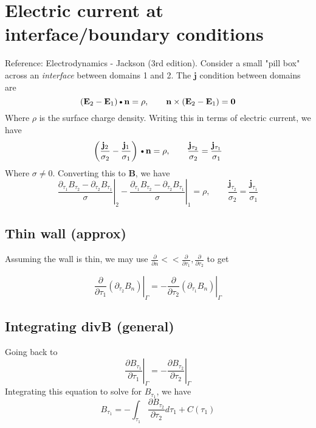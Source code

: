 \documentclass[11pt]{article}
\newcommand{\B}{\mathbf{B}}
\newcommand{\PD}{\partial}
\newcommand{\J}{\mathbf{j}}
\newcommand{\E}{\mathbf{E}}
\newcommand{\N}{\mathbf{n}}
\newcommand{\DOT}{\text{\textbullet}}
\begin{document}
\section{Electric current at interface/boundary conditions}
Reference: Electrodynamics - Jackson (3rd edition). Consider a small "pill box" across an \textit{interface} between domains 1 and 2. The $\J$ condition between domains are
\begin{equation}
    (\E_2 - \E_1) \DOT \N = \rho
    , \qquad
    \N \times (\E_2 - \E_1) = \mathbf{0}
\end{equation}
Where $\rho$ is the surface charge density. Writing this in terms of electric current, we have
\begin{equation}
    \left( \frac{\J_2}{\sigma_2} - \frac{\J_1}{\sigma_1} \right) \DOT \N = \rho
    , \qquad
    \frac{\J_{\tau_2}}{\sigma_2} = \frac{\J_{\tau_1}}{\sigma_1}
\end{equation}
Where $\sigma \ne 0$.
Converting this to $\B$, we have
\begin{equation}
    \left.
    \frac{\PD_{\tau_1} B_{\tau_2} - \PD_{\tau_2} B_{\tau_1}}
    {\sigma}
    \right |_{2} - 
    \left.
    \frac{\PD_{\tau_1} B_{\tau_2} - \PD_{\tau_2} B_{\tau_1}}
    {\sigma}
    \right |_{1}
    = \rho
    , \qquad
    \frac{\J_{\tau_2}}{\sigma_2} = \frac{\J_{\tau_1}}{\sigma_1}
\end{equation}


\subsection{Thin wall (approx)}
Assuming the wall is thin, we may use $\frac{\PD}{\PD n} << \frac{\PD}{\PD \tau_1},\frac{\PD}{\PD \tau_2}$ to get

\begin{equation}
  \left. \frac{\PD }{\PD \tau_1} \left( 
  \PD_{\tau_2} B_{n}
  \right) \right|_{\Gamma} = -
  \left. \frac{\PD }{\PD \tau_2} \left( 
  \PD_{\tau_1} B_{n}
  \right) \right|_{\Gamma}
\end{equation}

\subsection{Integrating divB (general)}
Going back to
\begin{equation}
  \left. \frac{\PD B_{\tau_1}}{\PD \tau_1} \right|_{\Gamma} = - 
  \left. \frac{\PD B_{\tau_2}}{\PD \tau_2} \right|_{\Gamma}
\end{equation}
Integrating this equation to solve for $B_{\tau_1}$, we have
\begin{equation}
  B_{\tau_1} = 
  -\int_{\tau_1} \frac{\PD B_{\tau_2}}{\PD \tau_2} d{\tau_1} + C(\tau_1)
\end{equation}
\end{document}
